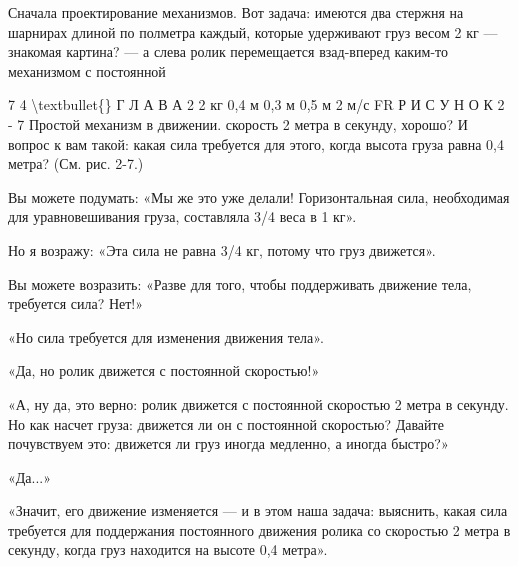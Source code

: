 \documentclass[10pt,oneside]{article}
\begin{document}
Сначала проектирование механизмов. Вот задача: имеются два стержня на шарнирах длиной по полметра каждый, которые удерживают груз весом 2 кг --- знакомая картина? --- а слева ролик перемещается взад-вперед каким-то механизмом с постоянной\par

7 4 \textbackslash{}textbullet\{\} Г Л А В А  2 2 кг 0,4 м 0,3 м 0,5 м 2 м/с FR Р И С У Н О К  2 - 7 Простой механизм в движении. скорость 2 метра в секунду, хорошо? И вопрос к вам такой: какая сила требуется для этого, когда высота груза равна 0,4 метра? (См. рис. 2-7.)\par

Вы можете подумать: «Мы же это уже делали! Горизонтальная сила, необходимая для уравновешивания груза, составляла 3/4 веса в 1 кг».\par

Но я возражу: «Эта сила не равна 3/4 кг, потому что груз движется».\par

Вы можете возразить: «Разве для того, чтобы поддерживать движение тела, требуется сила? Нет!»\par

«Но сила требуется для изменения движения тела».\par

«Да, но ролик движется с постоянной скоростью!»\par

«А, ну да, это верно: ролик движется с постоянной скоростью 2 метра в секунду. Но как насчет груза: движется ли он с постоянной скоростью? Давайте почувствуем это: движется ли груз иногда медленно, а иногда быстро?»\par

«Да...»\par

«Значит, его движение изменяется --- и в этом наша задача: выяснить, какая сила требуется для поддержания постоянного движения ролика со скоростью 2 метра в секунду, когда груз находится на высоте 0,4 метра».\par
\end{document}
